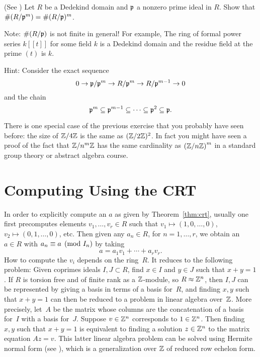 \begin{exercise}\label{ex:residuefieldofpower}(See \cite[Theorem~22(a)]{marcus1977number}) %
	Let $R$ be a Dedekind domain and $\mathfrak{p}$ a nonzero prime ideal in $R$.
	Show that $\#(R/\mathfrak{p}^m) = \#(R/\mathfrak{p})^m$.
	
	Note: $\#(R/\mathfrak{p})$ is not finite in general! For example,
	The ring of formal power series $k[[t]]$ for some field $k$
	is a Dedekind domain and the residue field at the prime $(t)$
	is $k$.
	
	Hint: Consider the exact sequence
	$$
	0\to \mathfrak{p}/\mathfrak{p}^{m} \to R/\mathfrak{p}^{m} \to R/\mathfrak{p}^{m-1} \to 0
	$$
	and the chain
	$$
	\mathfrak{p}^m \subseteq \mathfrak{p}^{m-1} \subseteq \cdots \subseteq \mathfrak{p}^2 \subseteq \mathfrak{p}.
	$$
\end{exercise}

\begin{remark}
	There is one special case of the previous exercise that you probably
	have seen before: the size of $\mathbb{Z}/4\mathbb{Z}$ is the same as
	$(\mathbb{Z}/2\mathbb{Z})^2$. In fact you might have seen a proof of
	the fact that $\mathbb{Z}/n^m\mathbb{Z}$ has the same cardinality as $\left(\mathbb{Z}/n\mathbb{Z}\right)^m$
	in a standard group theory or abstract algebra course.
\end{remark}

\section{Computing Using the CRT}
In order to explicitly compute an $a$ as given by Theorem~\ref{thm:crt},
usually one first precomputes elements $v_1, \ldots, v_r \in R$ such that
$v_1\mapsto (1,0,\ldots, 0)$, 
$v_2\mapsto (0,1,\ldots, 0)$, etc.
Then given any $a_n \in R$, for $n=1,\ldots, r$, we obtain an $a \in R$
with $a_n\equiv a\pmod{I_n}$ by taking
$$
  a = a_1 v_1 + \cdots + a_r v_r.
$$
How to compute the $v_i$ depends on the ring~$R$.   It reduces to
the following problem: Given coprimes ideals $I,J\subset R$, find
$x\in I$ and $y\in J$ such that $x+y=1$.   If $R$ is torsion free and
of finite rank 
as a $\mathbb{Z}$-module, so $R\approx \mathbb{Z}^n$,
then $I, J$ can be represented by giving a basis in terms of a basis
for~$R$, and finding $x,y$ such  that $x+y=1$ can then be reduced to 
a problem in linear algebra over~$\mathbb{Z}$.  
More precisely, let~$A$
be the matrix whose columns are the concatenation of a basis for~$I$
with a basis for~$J$.  
Suppose $v\in \mathbb{Z}^n$ corresponds to $1\in\mathbb{Z}^n$.
Then finding $x,y$ such that $x+y=1$ is equivalent to
finding a solution $z\in \mathbb{Z}^n$ to the matrix equation
$Az = v$. This latter linear algebra problem
can be solved using Hermite normal form 
(see \cite[\S4.7.1]{cohen:course_ant}),
which is a generalization over $\mathbb{Z}$
of reduced row echelon form.

